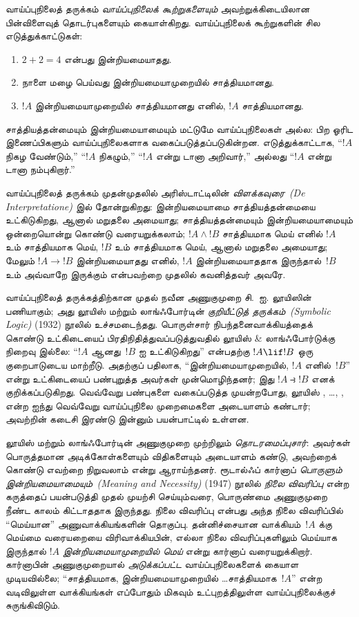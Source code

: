 \documentclass[../../../include/open-logic-section]{subfiles}
\begin{document}


வாய்ப்புநிலைத் தருக்கம் \emph{வாய்ப்புநிலைக் கூற்றுகளையும்} அவற்றுக்கிடையிலான
பின்விளைவுத் தொடர்புகளையும் கையாள்கிறது. வாய்ப்புநிலைக் கூற்றுகளின் சில
எடுத்துக்காட்டுகள்:
\begin{enumerate}
\item $2+2=4$ என்பது இன்றியமையாதது.
\item நாளை மழை பெய்வது இன்றியமையாமுறையில் சாத்தியமானது.
\item $!A$ இன்றியமையாமுறையில் சாத்தியமானது எனில், $!A$ சாத்தியமானது.
\end{enumerate}
சாத்தியத்தன்மையும் இன்றியமையாமையும் மட்டுமே வாய்ப்புநிலைகள் அல்ல: பிற ஓரிட
இணைப்பிகளும் வாய்ப்புநிலைகளாக வகைப்படுத்தப்படுகின்றன. எடுத்துக்காட்டாக,
“$!A$ நிகழ வேண்டும்,” “$!A$ நிகழும்,” “$!A$ என்று டானா அறிவார்,”
அல்லது “$!A$ என்று டானா நம்புகிறார்.”

வாய்ப்புநிலைத் தருக்கம் முதன்முதலில் அரிஸ்டாட்டிலின்
\emph{விளக்கவுரை~(De Interpretatione)} இல் தோன்றுகிறது: இன்றியமையாமை
சாத்தியத்தன்மையை உட்கிடுகிறது, ஆனால் மறுதலை அமையாது; சாத்தியத்தன்மையும்
இன்றியமையாமையும் ஒன்றையொன்று கொண்டு வரையறுக்கலாம்; $!A \land !B$
சாத்தியமாக மெய் எனில் $!A$ உம் சாத்தியமாக மெய், $!B$ உம் சாத்தியமாக
மெய், ஆனால் மறுதலை அமையாது; மேலும் $!A \to !B$ இன்றியமையாதது எனில்,
$!A$ இன்றியமையாததாக இருந்தால்~$!B$ உம் அவ்வாறே இருக்கும் என்பவற்றை
முதலில் கவனித்தவர் அவரே.

வாய்ப்புநிலைத் தருக்கத்திற்கான முதல் நவீன அணுகுமுறை சி.~ஐ. லூயிஸின்
பணியாகும்; அது லூயிஸ் மற்றும் லாங்ஃபோர்டின் \emph{குறியீட்டுத்
தருக்கம்~(Symbolic Logic)} (1932) நூலில் உச்சமடைந்தது. பொருள்சார்
நிபந்தனைவாக்கியத்தைக் கொண்டு உட்கிடையைப் பிரதிநிதித்துவப்படுத்துவதில்
லூயிஸ் \& லாங்ஃபோர்டுக்கு நிறைவு இல்லை: “$!A$ ஆனது~$!B$ ஐ உட்கிடுகிறது”
என்பதற்கு $!A \lif !B$ ஒரு குறைபாடுடைய மாற்றீடு. அதற்குப் பதிலாக,
“இன்றியமையாமுறையில், $!A$ எனில்~$!B$” என்று உட்கிடையைப்
பண்புறுத்த அவர்கள் முன்மொழிந்தனர்; இது $!A \strictif !B$ எனக்
குறிக்கப்படுகிறது. வெவ்வேறு பண்புகளை வகைப்படுத்த முயன்றபோது, லூயிஸ்
, \ldots, ,  என்ற ஐந்து வெவ்வேறு வாய்ப்புநிலை
முறைமைகளை அடையாளம் கண்டார்; அவற்றின் கடைசி இரண்டு இன்னும் பயன்பாட்டில்
உள்ளன.

லூயிஸ் மற்றும் லாங்ஃபோர்டின் அணுகுமுறை முற்றிலும்
\emph{தொடரமைப்புசார்}: அவர்கள் பொருத்தமான அடிக்கோள்களையும் விதிகளையும்
அடையாளம் கண்டு, அவற்றைக் கொண்டு எவற்றை நிறுவலாம் என்று ஆராய்ந்தனர்.
ரூடால்ஃப் கார்னாப் \emph{பொருளும் இன்றியமையாமையும்~(Meaning and
Necessity)} (1947) நூலில் \emph{நிலை விவரிப்பு} என்ற கருத்தைப் பயன்படுத்தி
முதல் முயற்சி செய்யும்வரை, பொருண்மை அணுகுமுறை நீண்ட காலம் கிட்டாததாக
இருந்தது. நிலை விவரிப்பு என்பது அந்த நிலை விவரிப்பில் “மெய்யான”
அணுவாக்கியங்களின் தொகுப்பு. தன்னிச்சையான வாக்கியம்~$!A$ க்கு மெய்மை
வரையறையை விரிவாக்கியபின், எல்லா நிலை விவரிப்புகளிலும் மெய்யாக இருந்தால்
$!A$ \emph{இன்றியமையாமுறையில் மெய்} என்று கார்னாப் வரையறுக்கிறார்.
கார்னாபின் அணுகுமுறையால் \emph{அடுக்கப்பட்ட} வாய்ப்புநிலைகளைக் கையாள
முடியவில்லை; “சாத்தியமாக, இன்றியமையாமுறையில் \ldots சாத்தியமாக~$!A$”
என்ற வடிவிலுள்ள வாக்கியங்கள் எப்போதும் மிகவும் உட்புறத்திலுள்ள
வாய்ப்புநிலைக்குச் சுருங்கிவிடும்.
\end{document}
